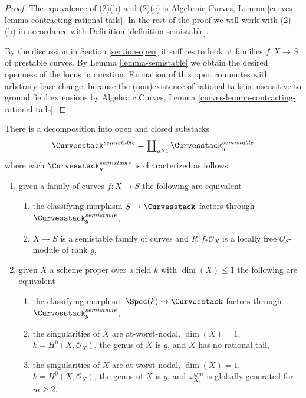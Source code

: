 \begin{proof}
The equivalence of (2)(b) and (2)(c) is
Algebraic Curves, Lemma \ref{curves-lemma-contracting-rational-tails}.
In the rest of the proof we will work with (2)(b)
in accordance with Definition \ref{definition-semistable}.

\medskip\noindent
By the discussion in Section \ref{section-open}
it suffices to look at families $f : X \to S$ of
prestable curves. By Lemma \ref{lemma-semistable}
we obtain the desired openness of the locus in question.
Formation of this open commutes with arbitrary base change,
because the (non)existence of rational tails is insensitive
to ground field extensions by
Algebraic Curves, Lemma \ref{curves-lemma-contracting-rational-tails}.
\end{proof}

\begin{lemma}
\label{lemma-semistable-one-piece-per-genus}
There is a decomposition into open and closed substacks
$$
\Curvesstack^{semistable} = \coprod\nolimits_{g \geq 1}
\Curvesstack^{semistable}_g
$$
where each $\Curvesstack^{semistable}_g$ is characterized as follows:
\begin{enumerate}
\item given a family of curves $f : X \to S$ the following are equivalent
\begin{enumerate}
\item the classifying morphism $S \to \Curvesstack$ factors
through $\Curvesstack^{semistable}_g$,
\item $X \to S$ is a semistable family of curves and
$R^1f_*\mathcal{O}_X$ is a locally free $\mathcal{O}_S$-module of rank $g$,
\end{enumerate}
\item given $X$ a scheme proper over a field $k$ with
$\dim(X) \leq 1$ the following are equivalent
\begin{enumerate}
\item the classifying morphism $\Spec(k) \to \Curvesstack$
factors through $\Curvesstack^{semistable}_g$,
\item the singularities of $X$ are at-worst-nodal, $\dim(X) = 1$,
$k = H^0(X, \mathcal{O}_X)$, the genus of $X$ is $g$, and $X$
has no rational tail,
\item the singularities of $X$ are at-worst-nodal, $\dim(X) = 1$,
$k = H^0(X, \mathcal{O}_X)$, the genus of $X$ is $g$, and
$\omega_{X_s}^{\otimes m}$ is globally generated for $m \geq 2$.
\end{enumerate}
\end{enumerate}
\end{lemma}


